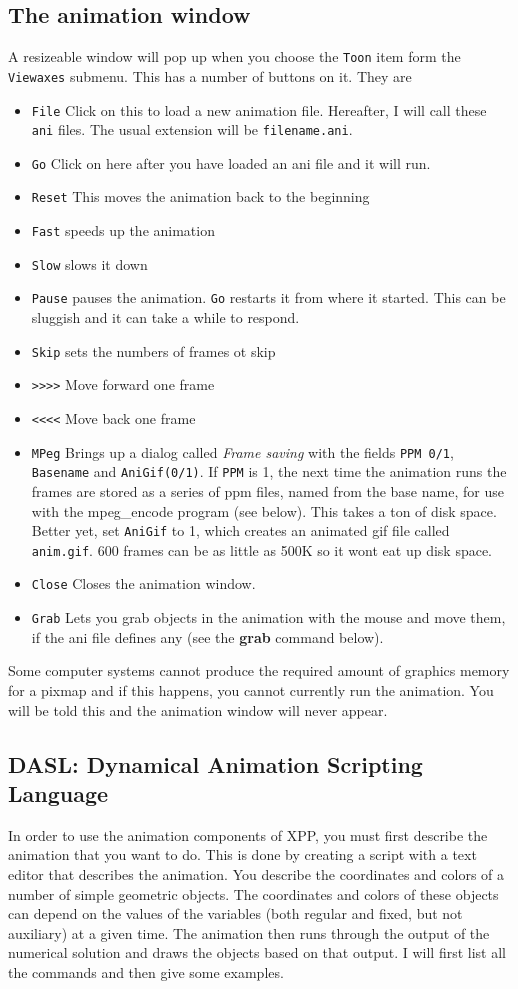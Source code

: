 \documentclass{article}
\begin{document}
\subsection{The animation window}
A resizeable window will pop up when you choose the {\tt Toon} item
form the {\tt Viewaxes} submenu. This has a number of buttons on it. They are
\begin{itemize}
\item {\tt File} Click on this to load a new animation
file. Hereafter, I will call these {\tt ani} files. The usual
extension will be {\tt filename.ani}.  
\item {\tt Go} Click on here after you have loaded an ani file and it
will run.
\item {\tt Reset} This moves the animation back to the beginning
\item {\tt Fast} speeds up the animation
\item {\tt Slow} slows it down
\item {\tt Pause} pauses the animation. {\tt Go} restarts it from
where it started. This can be sluggish and it can take a while to
respond.
\item{\tt Skip} sets the numbers of frames ot skip
\item{\tt >>>>} Move forward one frame
\item{\tt <<<<} Move back one frame
\item{\tt MPeg} Brings up a dialog called {\em Frame saving} with the fields
{\tt PPM 0/1}, {\tt Basename} and {\tt AniGif(0/1)}.  If {\tt PPM} is 1, the next time the animation runs the frames are stored
as a series of ppm files, named from the base name, for use with the
mpeg\_encode program (see below). This takes a ton of disk space.  Better yet, set
{\tt AniGif} to 1, which creates an animated gif file called {\tt anim.gif}.  600
frames can be as little as 500K so it wont eat up disk space.
\item{\tt Close} Closes the animation window.
\item{\tt Grab} Lets you grab objects in the animation with the mouse and move them, if the ani file defines any
(see the {\bf grab} command below).
\end{itemize}
Some computer systems cannot produce the required amount of graphics
memory for a pixmap and if this happens, you cannot currently run the
animation. You will be told this and the animation window will never
appear. 

\subsection{ DASL: Dynamical Animation Scripting Language}
In order to use the animation components of XPP, you must first
describe the animation that you want to do. This is done by creating a
script with a text editor that describes the animation. You describe
the coordinates and colors of a number of simple geometric
objects. The coordinates and colors of these objects can depend on the
values of the variables (both regular and fixed, but not auxiliary) at
a given time. The animation then runs through the output of the
numerical solution and draws the objects based on that output. I will
first list all the commands and then give some examples. 
\end{document}
